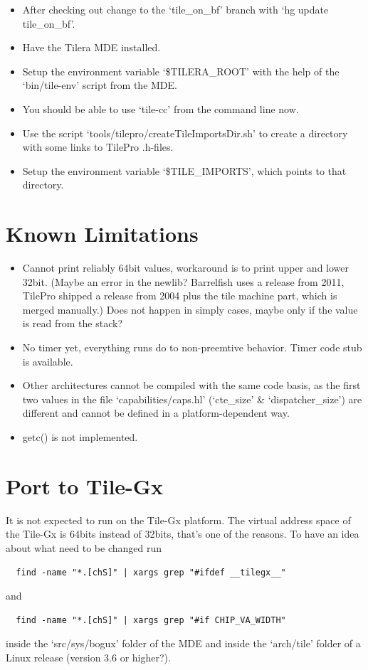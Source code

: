 \documentclass[a4paper,twoside]{report} %
\begin{document}
\begin{itemize}
  \item After checking out change to the `tile\_on\_bf' branch with `hg update tile\_on\_bf'.
  \item Have the Tilera MDE installed.
  \item Setup the environment variable `\$TILERA\_ROOT' with the help of the `bin/tile-env' script from the MDE.
  \item You should be able to use `tile-cc' from the command line now.
  \item Use the script `tools/tilepro/createTileImportsDir.sh' to create a directory with some links to TilePro .h-files.
  \item Setup the environment variable `\$TILE\_IMPORTS', which points to that directory.
\end{itemize}

\section{Known Limitations}
\begin{itemize}
  \item Cannot print reliably 64bit values, workaround is to print upper and lower 32bit. (Maybe an error in the newlib? Barrelfish uses a release from 2011, TilePro shipped a release from 2004 plus the tile machine part, which is merged manually.) Does not happen in simply cases, maybe only if the value is read from the stack?
  \item No timer yet, everything runs do to non-preemtive behavior. Timer code stub is available.
  \item Other architectures cannot be compiled with the same code basis, as the first two values in the file `capabilities/caps.hl' (`cte\_size' \& `dispatcher\_size') are different and cannot be defined in a platform-dependent way.
  \item getc() is not implemented.
\end{itemize}

\section{Port to Tile-Gx}
It is not expected to run on the Tile-Gx platform. The virtual address space of the Tile-Gx is 64bits instead of 32bits, that's one of the reasons. To have an idea about what need to be changed run
\begin{verbatim}
  find -name "*.[chS]" | xargs grep "#ifdef __tilegx__"
\end{verbatim}
and
\begin{verbatim}
  find -name "*.[chS]" | xargs grep "#if CHIP_VA_WIDTH"
\end{verbatim}
inside the `src/sys/bogux' folder of the MDE and inside the `arch/tile' folder of a Linux release (version 3.6 or higher?).
\end{document}
